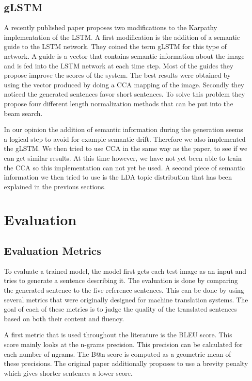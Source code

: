 \documentclass{article}
\begin{document}
\subsection{gLSTM}
A recently published paper \cite{Fernando2015} proposes two modifications to the Karpathy implementation of the LSTM. A first modification is the addition of a semantic guide to the LSTM network. They coined the term gLSTM for this type of network. A guide is a vector that contains semantic information about the image and is fed into the LSTM network at each time step. Most of the guides they propose improve the scores of the system. The best results were obtained by using the vector produced by doing a CCA mapping of the image. Secondly they noticed the generated sentences favor short sentences. To solve this problem they propose four different length normalization methods that can be put into the beam search.

In our opinion the addition of semantic information during the generation seems a logical step to avoid for example semantic drift. Therefore we also implemented the gLSTM. We then tried to use CCA in the same way as the paper, to see if we can get similar results. At this time however, we have not yet been able to train the CCA so this implementation can not yet be used.
A second piece of semantic information we then tried to use is the LDA topic distribution that has been explained in the previous sections.


\section{Evaluation}
\subsection{Evaluation Metrics}
To evaluate a trained model, the model first gets each test image as an input and tries to generate a sentence describing it. 
The evaluation is done by comparing the generated sentence to the five reference sentences. This can be done by using several metrics that were originally designed for machine translation systems. The goal of each of these metrics is to judge the quality of the translated sentences based on both their content and fluency.

A first metric that is used throughout the literature is the BLEU score.\cite{Papineni2001} This score mainly looks at the n-grams precision. This precision can be calculated for each number of ngrams. The B@n score is computed as a geometric mean of these precisions. 
The original paper additionally proposes to use a brevity penalty which gives shorter sentences a lower score.
\end{document}
